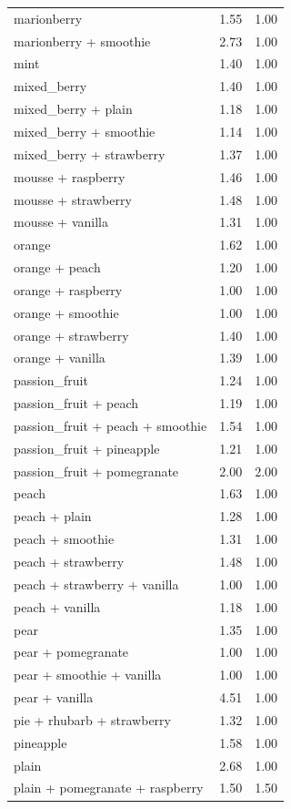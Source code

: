 \begin{table}
\begin{tabular}{lrr}
marionberry & 1.55 & 1.00 \\
marionberry + smoothie & 2.73 & 1.00 \\
mint & 1.40 & 1.00 \\
mixed\_berry & 1.40 & 1.00 \\
mixed\_berry + plain & 1.18 & 1.00 \\
mixed\_berry + smoothie & 1.14 & 1.00 \\
mixed\_berry + strawberry & 1.37 & 1.00 \\
mousse + raspberry & 1.46 & 1.00 \\
mousse + strawberry & 1.48 & 1.00 \\
mousse + vanilla & 1.31 & 1.00 \\
orange & 1.62 & 1.00 \\
orange + peach & 1.20 & 1.00 \\
orange + raspberry & 1.00 & 1.00 \\
orange + smoothie & 1.00 & 1.00 \\
orange + strawberry & 1.40 & 1.00 \\
orange + vanilla & 1.39 & 1.00 \\
passion\_fruit & 1.24 & 1.00 \\
passion\_fruit + peach & 1.19 & 1.00 \\
passion\_fruit + peach + smoothie & 1.54 & 1.00 \\
passion\_fruit + pineapple & 1.21 & 1.00 \\
passion\_fruit + pomegranate & 2.00 & 2.00 \\
peach & 1.63 & 1.00 \\
peach + plain & 1.28 & 1.00 \\
peach + smoothie & 1.31 & 1.00 \\
peach + strawberry & 1.48 & 1.00 \\
peach + strawberry + vanilla & 1.00 & 1.00 \\
peach + vanilla & 1.18 & 1.00 \\
pear & 1.35 & 1.00 \\
pear + pomegranate & 1.00 & 1.00 \\
pear + smoothie + vanilla & 1.00 & 1.00 \\
pear + vanilla & 4.51 & 1.00 \\
pie + rhubarb + strawberry & 1.32 & 1.00 \\
pineapple & 1.58 & 1.00 \\
plain & 2.68 & 1.00 \\
plain + pomegranate + raspberry & 1.50 & 1.50 \\

\end{tabular}
\end{table}

